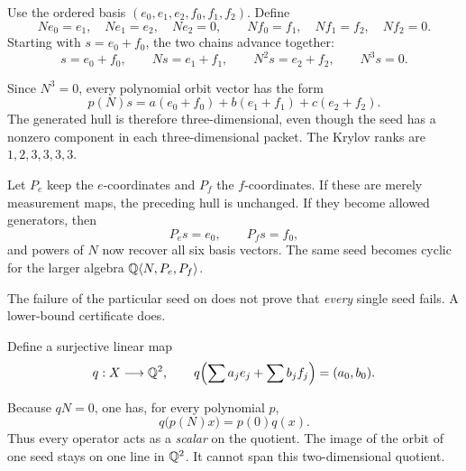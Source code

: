 Use the ordered basis $(e_0,e_1,e_2,f_0,f_1,f_2)$. Define
\[
Ne_0=e_1,\quad Ne_1=e_2,\quad Ne_2=0,
\qquad Nf_0=f_1,\quad Nf_1=f_2,\quad Nf_2=0.
\]
Starting with $s=e_0+f_0$, the two chains advance together:
\[
s=e_0+f_0,\qquad Ns=e_1+f_1,\qquad N^2s=e_2+f_2,\qquad N^3s=0.
\]


Since $N^3=0$, every polynomial orbit vector has the form
\[
p(N)s=a(e_0+f_0)+b(e_1+f_1)+c(e_2+f_2).
\]
The generated hull is therefore three-dimensional, even though the seed has a nonzero component in each three-dimensional packet. The Krylov ranks are $1,2,3,3,3,3$.

Let $P_e$ keep the $e$-coordinates and $P_f$ the $f$-coordinates. If these are merely measurement maps, the preceding hull is unchanged. If they become allowed generators, then
\[
P_es=e_0,\qquad P_fs=f_0,
\]
and powers of $N$ now recover all six basis vectors. The same seed becomes cyclic for the larger algebra $\mathbb Q\langle N,P_e,P_f\rangle$.


The failure of the particular seed on  does not prove that \emph{every} single seed fails. A lower-bound certificate does.

Define a surjective linear map
\[
q:X\longrightarrow\mathbb Q^2,\qquad
q\Bigl(\sum a_je_j+\sum b_jf_j\Bigr)=(a_0,b_0).
\]


Because $qN=0$, one has, for every polynomial $p$,
\[
q\bigl(p(N)x\bigr)=p(0)q(x).
\]
Thus every operator acts as a \emph{scalar} on the quotient. The image of the orbit of one seed stays on one line in $\mathbb Q^2$. It cannot span this two-dimensional quotient.

